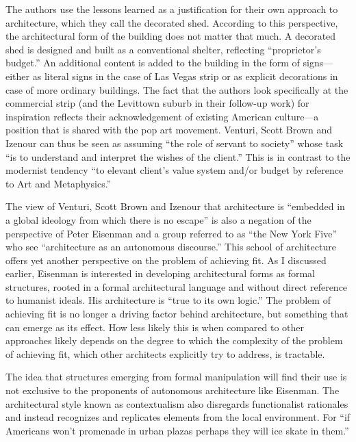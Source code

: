 The authors use the lessons learned as a justification for their own approach to architecture,
which they call the decorated shed. According to this perspective, the architectural form of
the building does not matter that much. A decorated shed is designed and built as a conventional
shelter, reflecting ``proprietor's budget.'' An additional content is added to
the building in the form of signs---either as literal signs in the case of Las Vegas strip or
as explicit decorations in case of more ordinary buildings. The fact that the authors look
specifically at the commercial strip (and the Levittown suburb in their follow-up work) for
inspiration reflects their acknowledgement of existing American culture---a position that
is shared with the pop art movement. Venturi, Scott Brown and Izenour can thus be seen as
assuming ``the role of servant to society'' whose task ``is to understand and interpret
the wishes of the client.'' This is in contrast to the modernist
tendency ``to elevant client's value system and/or budget by reference to Art and
Metaphysics.''

The view of Venturi, Scott Brown and Izenour that architecture is ``embedded in a global ideology
from which there is no escape'' is also a negation of the perspective of Peter Eisenman and a
group referred to as ``the New York Five'' who see ``architecture as an autonomous
discourse.'' This school of architecture offers yet another perspective on
the problem of achieving fit. As I discussed earlier, Eisenman is interested in developing
architectural forms as formal structures, rooted in a formal architectural language and
without direct reference to humanist ideals. His architecture is ``true to its own
logic.''
The problem of achieving fit is no longer a driving factor behind architecture, but
something that can emerge as its effect. How less likely this is when compared
to other approaches likely depends on the degree to which the complexity of the problem of
achieving fit, which other architects explicitly try to address, is tractable.

The idea that structures emerging from formal manipulation will find their use is not
exclusive to the proponents of autonomous architecture like Eisenman.
The architectural style known as contextualism also disregards functionalist rationales
and instead recognizes and replicates elements from the local environment. For ``if
Americans won't promenade in urban plazas perhaps they will ice skate in them.''

